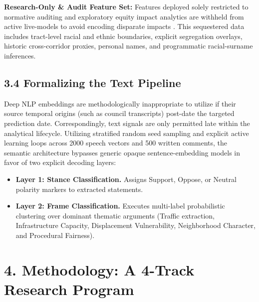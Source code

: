 \textbf{Research-Only \& Audit Feature Set:} Features deployed solely restricted to normative auditing and exploratory equity impact analytics are withheld from active live-models to avoid encoding disparate impacts \cite{barocas2016}. This sequestered data includes tract-level racial and ethnic boundaries, explicit segregation overlays, historic cross-corridor proxies, personal names, and programmatic racial-surname inferences. 

\subsection*{3.4 Formalizing the Text Pipeline}
Deep NLP embeddings are methodologically inappropriate to utilize if their source temporal origins (such as council transcripts) post-date the targeted prediction date. Correspondingly, text signals are only permitted late within the analytical lifecycle. Utilizing stratified random seed sampling and explicit active learning loops across 2000 speech vectors and 500 written comments, the semantic architecture bypasses generic opaque sentence-embedding models in favor of two explicit decoding layers:
\begin{itemize}
    \item \textbf{Layer 1: Stance Classification.} Assigns Support, Oppose, or Neutral polarity markers to extracted statements.
    \item \textbf{Layer 2: Frame Classification.} Executes multi-label probabilistic clustering over dominant thematic arguments (Traffic extraction, Infrastructure Capacity, Displacement Vulnerability, Neighborhood Character, and Procedural Fairness).
\end{itemize}

\section*{4. Methodology: A 4-Track Research Program}

